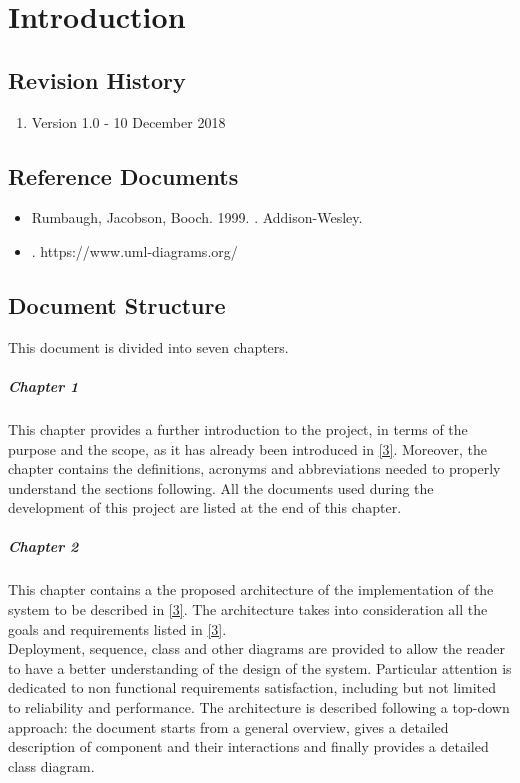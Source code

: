 \documentclass[../DD.tex]{subfiles}
\begin{document}
\chapter{Introduction}
\thispagestyle{fancy}
		
		
		
		
		
		\section{Revision History}
		\begin{enumerate}
			\item Version 1.0 - 10 December 2018
		\end{enumerate}
		
		\section{Reference Documents}
			\begin{itemize}
				\item Rumbaugh, Jacobson, Booch. 1999. . Addison-Wesley.
				\item {}. https://www.uml-diagrams.org/
			\end{itemize}
			
		\section{Document Structure}
		This document is divided into seven chapters.
		
		\paragraph{Chapter 1}
			This chapter provides a further introduction to the project, in terms of the purpose and the scope, as it has already been introduced in \hyperref[ref:3]{[3]}. Moreover, the chapter contains the definitions, acronyms and abbreviations needed to properly understand the sections following. All the documents used during the development of this project are listed at the end of this chapter.
		\paragraph{Chapter 2}
			This chapter contains a the proposed architecture of the implementation of the system to be described in \hyperref[ref:3]{[3]}. The architecture takes into consideration all the goals and requirements listed in \hyperref[ref:3]{[3]}.\\
			Deployment, sequence, class and other diagrams are provided to allow the reader to have a better understanding of the design of the system. Particular attention is dedicated to non functional requirements satisfaction, including but not limited to reliability and performance. The architecture is described following a top-down approach: the document starts from a general overview, gives a detailed description of component and their interactions and finally provides a detailed class diagram.
\end{document}
